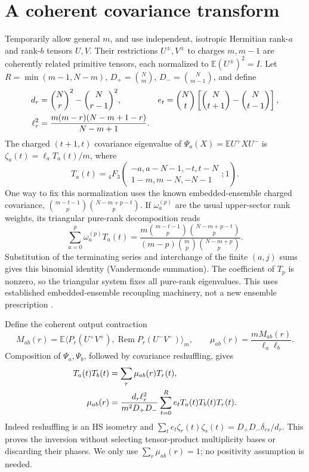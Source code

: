 \documentclass[11pt,a4paper]{article}
\newcommand{\EE}{\mathbb E}
\newcommand{\Rem}{\operatorname{Rem}}
\begin{document}
\newpage
\section{A coherent covariance transform}
Temporarily allow general $m$, and use independent, isotropic
Hermitian rank-$a$ and rank-$b$ tensors $U,V$. Their restrictions
$U^\pm,V^\pm$ to charges $m,m-1$ are coherently related primitive
tensors, each normalized to $\EE(U^\pm)^2=I$.
Let $R=\min(m-1,N-m)$, $D_+=\binom Nm$, $D_-=\binom N{m-1}$,
and define
\begin{align}
 d_r&=\binom Nr^2-\binom N{r-1}^2,
 &e_t&=\binom Nt\left[\binom N{t+1}-\binom N{t-1}\right],\notag\\
 \ell_r^2&=\frac{m(m-r)(N-m+1-r)}{N-m+1}.\label{dims}
\end{align}
The charged $(t+1,t)$ covariance eigenvalue of
$\Psi_a(X)=\EE U^+XU^-$ is $\zeta_a(t)=\ell_a T_a(t)/m$, where
\begin{equation}
 T_a(t)={}_4F_3\!\left(\begin{matrix}-a,a-N-1,-t,t-N\\
 1-m,m-N,-N-1\end{matrix};1\right).\label{T}
\end{equation}
One way to fix this normalization uses the known embedded-ensemble
charged covariance, $\binom{m-t-1}{p}\binom{N-m+p-t}{p}$.
If $\omega_a^{(p)}$ are the usual upper-sector rank weights, its
triangular pure-rank decomposition reads
\begin{equation}
 \sum_{a=0}^p\omega_a^{(p)}T_a(t)=
 \frac{m\binom{m-t-1}{p}\binom{N-m+p-t}{p}}
 {(m-p)\binom mp\binom{N-m+p}{p}}.\label{triangular}
\end{equation}
Substitution of the terminating series and interchange of the finite
$(a,j)$ sums gives this binomial identity (Vandermonde summation).
The coefficient of $T_p$ is nonzero, so the triangular system fixes
all pure-rank eigenvalues. This uses established embedded-ensemble
recoupling machinery, not a new ensemble prescription \cite{kota}.

Define the coherent output contraction
\begin{equation}
 M_{ab}(r)=\EE\langle P_r(U^+V^+),\Rem P_r(U^-V^-)\rangle_m,
 \qquad \mu_{ab}(r)=\frac{mM_{ab}(r)}{\ell_a\ell_b}.
\end{equation}
Composition of $\Psi_a,\Psi_b$, followed by covariance reshuffling,
gives
\begin{align}
 T_a(t)T_b(t)&=\sum_r\mu_{ab}(r)T_r(t),\notag\\
 \mu_{ab}(r)&=\frac{d_r\ell_r^2}{m^2D_+D_-}
       \sum_{t=0}^R e_tT_a(t)T_b(t)T_r(t).\label{mu}
\end{align}
Indeed reshuffling is an HS isometry and
$\sum_t e_t\zeta_r(t)\zeta_s(t)=D_+D_-\delta_{rs}/d_r$.
This proves the inversion without selecting tensor-product
multiplicity bases or discarding their phases. We only use
$\sum_r\mu_{ab}(r)=1$; no positivity assumption is needed.
\end{document}
